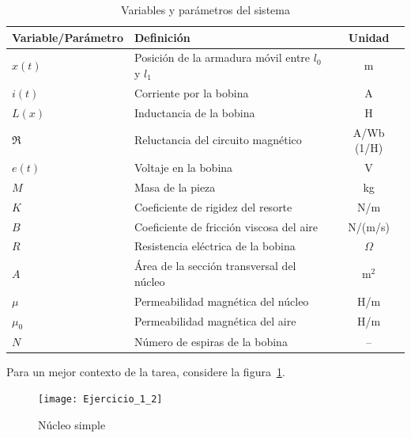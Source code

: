 \documentclass[
  11pt,
  letterpaper,
   addpoints,
   answers
  ]{exam}
\newcommand{\Rel}{\mathfrak{R}} %
\begin{document}
\begin{questions}
\begin{table}[h!]
  \centering
  \caption{Variables y parámetros del sistema}
  \label{tab:variables}
  \small
  \begin{tabular}{@{}l p{9.5cm} c@{}}
    \toprule
    \textbf{Variable/Parámetro} & \textbf{Definición} & \textbf{Unidad} \\
    \midrule
    $x(t)$      & Posición de la armadura móvil entre $l_0$ y $l_1$ & m \\
    $i(t)$      & Corriente por la bobina                           & A \\
    $L(x)$      & Inductancia de la bobina                          & H \\
  $\Rel$      & Reluctancia del circuito magnético                & A/Wb (1/H) \\
    $e(t)$      & Voltaje en la bobina                              & V \\
    $M$         & Masa de la pieza                                  & kg \\
    $K$         & Coeficiente de rigidez del resorte                & N/m \\
    $B$         & Coeficiente de fricción viscosa del aire          & N/(m/s) \\
    $R$         & Resistencia eléctrica de la bobina                & $\Omega$ \\
    $A$         & Área de la sección transversal del núcleo         & m$^2$ \\
    $\mu$       & Permeabilidad magnética del núcleo                & H/m \\
    $\mu_0$     & Permeabilidad magnética del aire                  & H/m \\
    $N$         & Número de espiras de la bobina                    & -- \\
    \bottomrule
  \end{tabular}
\end{table}

\medskip
Para un mejor contexto de la tarea, considere la figura~\ref{fig:core}.

\begin{figure}[h!]
  \centering
  \texttt{[image: Ejercicio\_1\_2]}
  \caption{Núcleo simple}
  \label{fig:core}
\end{figure}


\end{questions}
\end{document}
